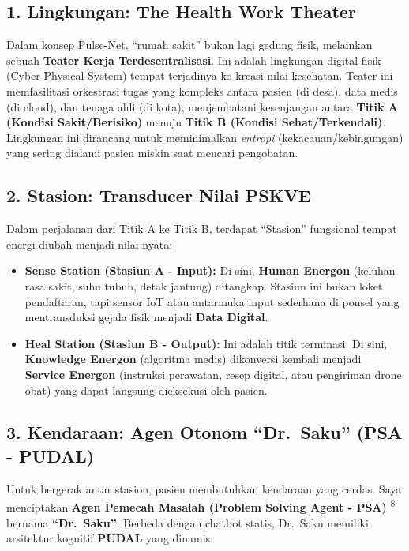 \documentclass[
  letterpaper,
  DIV=11,
  numbers=noendperiod]{scrreprt}
\providecommand{\tightlist}{%
  \setlength{\itemsep}{0pt}\setlength{\parskip}{0pt}}
\begin{document}
\subsection{1. Lingkungan: The Health Work
Theater}\label{lingkungan-the-health-work-theater}

Dalam konsep Pulse-Net, ``rumah sakit'' bukan lagi gedung fisik,
melainkan sebuah \textbf{Teater Kerja Terdesentralisasi}. Ini adalah
lingkungan digital-fisik (Cyber-Physical System) tempat terjadinya
ko-kreasi nilai kesehatan. Teater ini memfasilitasi orkestrasi tugas
yang kompleks antara pasien (di desa), data medis (di cloud), dan tenaga
ahli (di kota), menjembatani kesenjangan antara \textbf{Titik A (Kondisi
Sakit/Berisiko)} menuju \textbf{Titik B (Kondisi Sehat/Terkendali)}.
Lingkungan ini dirancang untuk meminimalkan \emph{entropi}
(kekacauan/kebingungan) yang sering dialami pasien miskin saat mencari
pengobatan.

\subsection{2. Stasion: Transducer Nilai
PSKVE}\label{stasion-transducer-nilai-pskve}

Dalam perjalanan dari Titik A ke Titik B, terdapat ``Stasion''
fungsional tempat energi diubah menjadi nilai nyata:

\begin{itemize}
\tightlist
\item
  \textbf{Sense Station (Stasiun A - Input):} Di sini, \textbf{Human
  Energon} (keluhan rasa sakit, suhu tubuh, detak jantung) ditangkap.
  Stasiun ini bukan loket pendaftaran, tapi sensor IoT atau antarmuka
  input sederhana di ponsel yang mentransduksi gejala fisik menjadi
  \textbf{Data Digital}.
\item
  \textbf{Heal Station (Stasiun B - Output):} Ini adalah titik
  terminasi. Di sini, \textbf{Knowledge Energon} (algoritma medis)
  dikonversi kembali menjadi \textbf{Service Energon} (instruksi
  perawatan, resep digital, atau pengiriman drone obat) yang dapat
  langsung dieksekusi oleh pasien.
\end{itemize}

\subsection{3. Kendaraan: Agen Otonom ``Dr.~Saku'' (PSA -
PUDAL)}\label{kendaraan-agen-otonom-dr.-saku-psa---pudal}

Untuk bergerak antar stasion, pasien membutuhkan kendaraan yang cerdas.
Saya menciptakan \textbf{Agen Pemecah Masalah (Problem Solving Agent -
PSA)} \textsuperscript{8} bernama \textbf{``Dr.~Saku''}. Berbeda dengan
chatbot statis, Dr.~Saku memiliki arsitektur kognitif \textbf{PUDAL}
yang dinamis:
\end{document}

